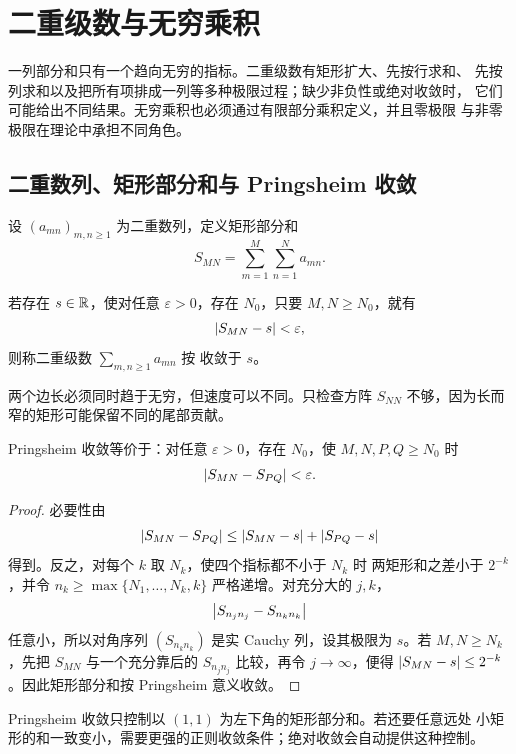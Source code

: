 \chapter{二重级数与无穷乘积}
\label{chap:double-series-infinite-products}

一列部分和只有一个趋向无穷的指标。二重级数有矩形扩大、先按行求和、
先按列求和以及把所有项排成一列等多种极限过程；缺少非负性或绝对收敛时，
它们可能给出不同结果。无穷乘积也必须通过有限部分乘积定义，并且零极限
与非零极限在理论中承担不同角色。

\section{二重数列、矩形部分和与 Pringsheim 收敛}

设 \((a_{mn})_{m,n\ge1}\) 为二重数列，定义矩形部分和
\[
 S_{MN}=\sum_{m=1}^M\sum_{n=1}^N a_{mn}.
\]

\begin{definition}
若存在 \(s\in\mathbb{R}\)，使对任意 \(\varepsilon>0\)，存在
\(N_0\)，只要 \(M,N\ge N_0\)，就有
\[
 \left|S_{MN}-s\right|<\varepsilon,
\]
则称二重级数 \(\sum_{m,n\ge1}a_{mn}\) 按
收敛于 \(s\)。
\end{definition}

两个边长必须同时趋于无穷，但速度可以不同。只检查方阵
\(S_{NN}\) 不够，因为长而窄的矩形可能保留不同的尾部贡献。

\begin{theorem}
\label{thm:double-series-cauchy}
Pringsheim 收敛等价于：对任意 \(\varepsilon>0\)，存在 \(N_0\)，使
\(M,N,P,Q\ge N_0\) 时
\[
 \left|S_{MN}-S_{PQ}\right|<\varepsilon.
\]
\end{theorem}

\begin{proof}
必要性由
\[
 \left|S_{MN}-S_{PQ}\right|
 \le\left|S_{MN}-s\right|+\left|S_{PQ}-s\right|
\]
得到。反之，对每个 \(k\) 取 \(N_k\)，使四个指标都不小于 \(N_k\) 时
两矩形和之差小于 \(2^{-k}\)，并令 \(n_k\ge\max\{N_1,\ldots,N_k,k\}\)
严格递增。对充分大的 \(j,k\)，
\[
 \left|S_{n_jn_j}-S_{n_kn_k}\right|
\]
任意小，所以对角序列 \((S_{n_kn_k})\) 是实 Cauchy 列，设其极限为
\(s\)。若 \(M,N\ge N_k\)，先把 \(S_{MN}\) 与一个充分靠后的
\(S_{n_jn_j}\) 比较，再令 \(j\to\infty\)，便得
\(\left|S_{MN}-s\right|\le2^{-k}\)。因此矩形部分和按 Pringsheim 意义收敛。
\end{proof}

Pringsheim 收敛只控制以 \((1,1)\) 为左下角的矩形部分和。若还要任意远处
小矩形的和一致变小，需要更强的正则收敛条件；绝对收敛会自动提供这种控制。

